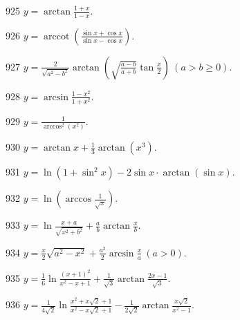 \begin{prob}[S]{925}
$y = \arctan\frac{1 + x}{1 - x}$.
\end{prob}

\begin{prob}[S]{926}
$y = \operatorname{arccot}\left(\frac{\sin x + \cos x}{\sin x - \cos x}\right)$.
\end{prob}

\begin{prob}[S]{927}
$y = \frac{2}{\sqrt{a^2 - b^2}} \arctan \left( \sqrt{\frac{a - b}{a + b}} \tan \frac{x}{2} \right) \ (a > b \geqslant 0)$.
\end{prob}

\begin{prob}[S]{928}
$y = \arcsin \frac{1 - x^2}{1 + x^2}$.
\end{prob}

\begin{prob}[S]{929}
$y = \frac{1}{\arccos^2(x^2)}$.
\end{prob}

\begin{prob}[S]{930}
$y = \arctan x + \frac{1}{3} \arctan(x^3)$.
\end{prob}

\begin{prob}[S]{931}
$y = \ln(1 + \sin^2 x) - 2 \sin x \cdot \arctan(\sin x)$.
\end{prob}

\begin{prob}[S]{932}
$y = \ln \left( \arccos \frac{1}{\sqrt{x}} \right)$.
\end{prob}

\begin{prob}[S]{933}
$y = \ln \frac{x + a}{\sqrt{x^2 + b^2}} + \frac{a}{b} \arctan \frac{x}{b}$.
\end{prob}

\begin{prob}[S]{934}
$y = \frac{x}{2} \sqrt{a^2 - x^2} + \frac{a^2}{2} \arcsin \frac{x}{a} \ (a > 0)$.
\end{prob}

\begin{prob}[S]{935}
$y = \frac{1}{6} \ln \frac{(x + 1)^2}{x^2 - x + 1} + \frac{1}{\sqrt{3}} \arctan \frac{2x - 1}{\sqrt{3}}$.
\end{prob}

\begin{prob}[S]{936}
$y = \frac{1}{4\sqrt{2}} \ln \frac{x^2 + x\sqrt{2} + 1}{x^2 - x\sqrt{2} + 1} - \frac{1}{2\sqrt{2}} \arctan \frac{x\sqrt{2}}{x^2 - 1}$.
\end{prob}

